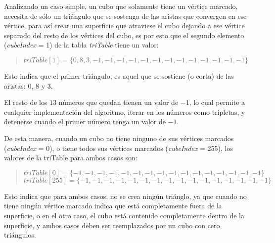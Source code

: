 Analizando un caso simple, un cubo que solamente tiene un vértice marcado, necesita de sólo un triángulo que se sostenga de las aristas que convergen en ese vértice, para así crear una superficie que atraviese el cubo dejando a ese vértice separado del resto de los vértices del cubo, es por esto que el segundo elemento (\emph{cubeIndex} = 1) de la tabla \emph{triTable} tiene un valor:

\begin{quote}
	$triTable[1] = \{0, 8, 3, -1, -1, -1, -1, -1, -1, -1, -1, -1, -1, -1, -1, -1\}$
\end{quote}

Esto indica que el primer triángulo, es aquel que se sostiene (o corta) de las aristas: $0$, $8$ y $3$.

El resto de los $13$ números que quedan tienen un valor de $-1$, lo cual permite a cualquier implementación del algoritmo, iterar en los números como tripletas, y detenerse cuando el primer número tenga un valor de $-1$.

De esta manera, cuando un cubo no tiene ninguno de sus vértices marcados (\emph{cubeIndex} = 0), o tiene todos sus vértices marcados (\emph{cubeIndex} = 255), los valores de la triTable para ambos casos son:

\begin{quote}
	$triTable[0]	= \{-1, -1, -1, -1, -1, -1, -1, -1, -1, -1, -1, -1, -1, -1, -1, -1\}$\\
	$triTable[255]	= \{-1, -1, -1, -1, -1, -1, -1, -1, -1, -1, -1, -1, -1, -1, -1, -1\}$
\end{quote}

Esto indica que para ambos casos, no se crea ningún triánglo, ya que cuando no tiene ningún vértice marcado indica que está completamente fuera de la superficie, o en el otro caso, el cubo está contenido completamente dentro de la superficie, y ambos casos deben ser reemplazados por un cubo con cero triángulos.